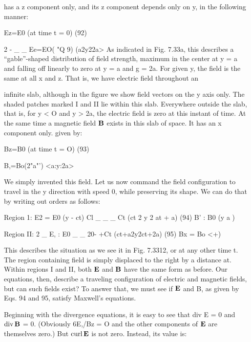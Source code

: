 has a z component only, and its z component depends only on y, in
the following manner:

\begin{equation}
\end{equation}
Ez=E0%
(at time t = 0) (92)

2 - _ _
Ee=EO( "Q 9) (a2y22a>
As indicated in Fig. 7.33a, this describes a ``gable''-shaped distribution
of field strength, maximum in the center at y = a and falling off
linearly to zero at y = a and g = 2a. For given y, the field is the
same at all x and z. That is, we have electric field throughout an

infinite slab, although in the figure we show field vectors on the y axis
only. The shaded patches marked I and II lie within this slab.
Everywhere outside the slab, that is, for y < O and y > 2a, the electric
field is zero at this instant of time. At the same time a magnetic
field $\mathbf{B}$ exists in this slab of space. It has an x component only.
given by:

\begin{equation}
\end{equation}
Bz=B0%
(at time t = O) (93)

B,=Bo(2"a"') <a:y:2a>

We simply invented this field. Let us now command the field
configuration to travel in the y direction with speed 0, while preserving
its shape. We can do that by writing out orders as follows:

\begin{equation}
\end{equation}
Region 1:
E2 = E0 (y - ct)
Cl _ _
_ Ct (ct 2 y 2 at + a) (94)
B' : B0 (y a )


\begin{equation}
\end{equation}
Region II:
2 _
E, : E0  _ _
20- +Ct (ct+a2y2ct+2a) (95)
Bx = Bo <+)

This describes the situation as we see it in Fig. 7.3312, or at any other
time t. The region containing field is simply displaced to the right
by a distance at. Within regions I and II, both $\mathbf{E}$ and $\mathbf{B}$ have the same
form as before. Our equations, then, describe a traveling configuration
of electric and magnetic fields, but can such fields exist? To
answer that, we must see if $\mathbf{E}$ and B, as given by Eqs. 94 and 95, satisfy
Maxwell's equations.

Beginning with the divergence equations, it is easy to see that
div E = 0 and $\operatorname{div}\mathbf{B}$ = 0. (Obviously 6E,/Bz = O and the other
components of $\mathbf{E}$ are themselves zero.) But $\operatorname{curl}\mathbf{E}$ is not zero.
Instead, its value is:

